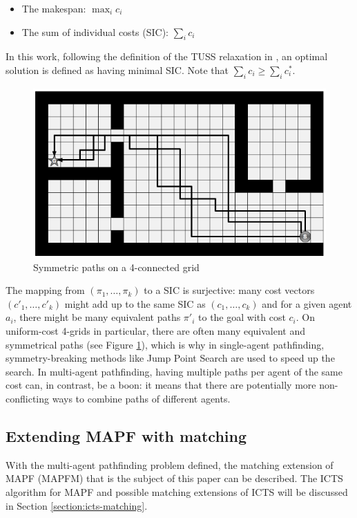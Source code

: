 \documentclass[english,10pt]{article}
\begin{document}
	\begin{itemize}
		\item The makespan: $\max_{i} c_i$
		\item The sum of individual costs (SIC): $\sum_i c_i$
	\end{itemize}
	In this work, following the definition of the TUSS relaxation in \cite{mulderij2020}, an optimal solution is defined as having minimal SIC. Note that $\sum_i c_i \geq \sum_i c^*_i$.
	\begin{figure}
		\vspace{-10pt}
		\centering
		\includegraphics[width=\linewidth]{img/symmetries}
		\caption{Symmetric paths on a 4-connected grid\cite{harabor2010}}
		\label{fig:symmetries}
	\end{figure}
	The mapping from $(\pi_1,\ldots,\pi_k)$ to a SIC is surjective: many cost vectors $(c'_1,\ldots,c'_k)$ might add up to the same SIC as $(c_1,\ldots,c_k)$ and for a given agent $a_i$, there might be many equivalent paths $\pi'_i$ to the goal with cost $c_i$. On uniform-cost 4-grids in particular, there are often many equivalent and symmetrical paths\cite{harabor2010} (see Figure \ref{fig:symmetries}), which is why in single-agent pathfinding, symmetry-breaking methods like Jump Point Search\cite{harabor2011} are used to speed up the search. In multi-agent pathfinding, having multiple paths per agent of the same cost can, in contrast, be a boon: it means that there are potentially more non-conflicting ways to combine paths of different agents.
	
	\subsection{Extending MAPF with matching}
	With the multi-agent pathfinding problem defined, the matching extension of MAPF (MAPFM) that is the subject of this paper can be described. The ICTS algorithm for MAPF and possible matching extensions of ICTS will be discussed in Section \ref{section:icts-matching}.
	
\end{document}
